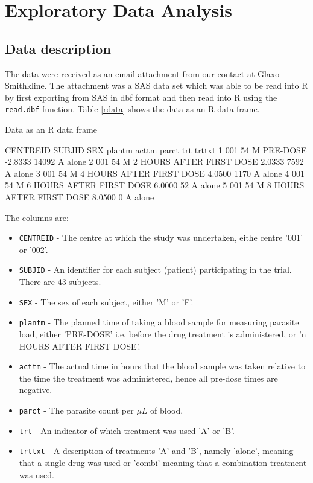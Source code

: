 \chapter{Exploratory Data Analysis}
\section{Data description}
The data were received as an email attachment from our contact at Glaxo Smithkline. The attachment was a SAS data set which was able to be read into R by first exporting from SAS in dbf format and then read into R using the \texttt{read.dbf} function.
Table \ref{rdata} shows the data as an R data frame. 
\begin{table}[h]
\caption{Data as an R data frame}\label{rdata}
\begin{boxedverbatim}
    CENTREID SUBJID SEX                    plantm   acttm  parct trt trttxt
1        001     54   M                  PRE-DOSE -2.8333  14092   A  alone
2        001     54   M  2 HOURS AFTER FIRST DOSE  2.0333   7592   A  alone
3        001     54   M  4 HOURS AFTER FIRST DOSE  4.0500   1170   A  alone
4        001     54   M  6 HOURS AFTER FIRST DOSE  6.0000     52   A  alone
5        001     54   M  8 HOURS AFTER FIRST DOSE  8.0500      0   A  alone
\end{boxedverbatim}
\end{table}

The columns are:
\begin{itemize}
\item\texttt{CENTREID} - The centre at which the study was undertaken, eithe centre '001' or '002'.
\item\texttt{SUBJID} - An identifier for each subject (patient) participating in the trial. There are 43 subjects.
\item\texttt{SEX} - The sex of each subject, either 'M' or 'F'.
\item\texttt{plantm} - The planned time of taking a blood sample for measuring parasite load, either 'PRE-DOSE' i.e. before the drug treatment is administered, or 'n HOURS AFTER FIRST DOSE'.
\item\texttt{acttm} - The actual time in hours that the blood sample was taken relative to the time the treatment was administered, hence all pre-dose times are negative.
\item\texttt{parct} - The parasite count per $\mu L$ of blood.
\item\texttt{trt} - An indicator of which treatment was used 'A' or 'B'.
\item\texttt{trttxt} - A description of treatments 'A' and 'B', namely 'alone', meaning that a single drug was used or 'combi' meaning that a combination treatment was used.
\end{itemize}
